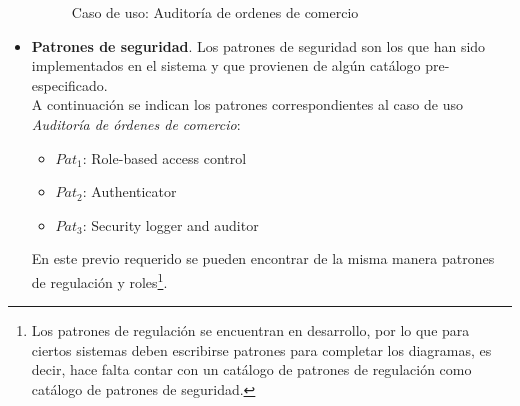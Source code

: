 \begin{itemize}
	\begin{figure}[h!]
	\begin{center}
    			\hspace{1cm}
 		\caption{Caso de uso: Auditoría de ordenes de comercio}
 		\label{ej_useCase_actDiag}
 	\end{center}
	\end{figure}
	\item \textbf{Patrones de seguridad}. Los patrones de seguridad son los que han sido implementados en el sistema y que provienen de algún catálogo pre-especificado.\\
		A continuación se indican los patrones correspondientes al caso de uso \textit{Auditoría de órdenes de comercio}:
	\begin{itemize}[noitemsep]
		\item $Pat_1$: Role-based access control
		\item $Pat_2$: Authenticator
		\item $Pat_3$: Security logger and auditor
	\end{itemize}
	En este previo requerido se pueden encontrar de la misma manera patrones de regulación y roles\footnote{Los patrones de regulación se encuentran en desarrollo, por lo que para ciertos sistemas deben escribirse patrones para completar los diagramas, es decir, hace falta contar con un catálogo de patrones de regulación como catálogo de patrones de seguridad.}.
\end{itemize}


